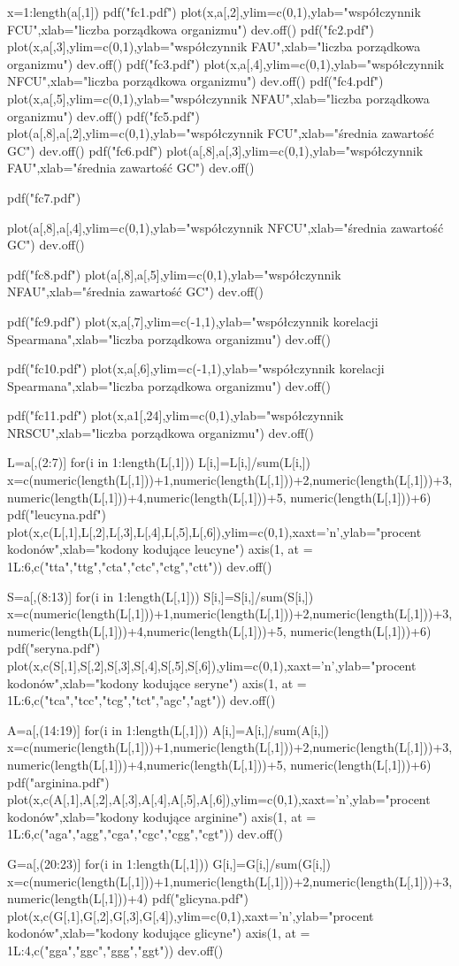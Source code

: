 x=1:length(a[,1])
pdf("fc1.pdf")
plot(x,a[,2],ylim=c(0,1),ylab="współczynnik FCU",xlab="liczba porządkowa organizmu")
dev.off() 
pdf("fc2.pdf")
plot(x,a[,3],ylim=c(0,1),ylab="współczynnik FAU",xlab="liczba porządkowa organizmu")
dev.off()
pdf("fc3.pdf")
plot(x,a[,4],ylim=c(0,1),ylab="współczynnik NFCU",xlab="liczba porządkowa organizmu")
 dev.off() 
 pdf("fc4.pdf")
 plot(x,a[,5],ylim=c(0,1),ylab="współczynnik NFAU",xlab="liczba porządkowa organizmu")
 dev.off() 
 pdf("fc5.pdf")
 plot(a[,8],a[,2],ylim=c(0,1),ylab="współczynnik FCU",xlab="średnia zawartość GC")
 dev.off()
 pdf("fc6.pdf")
 plot(a[,8],a[,3],ylim=c(0,1),ylab="współczynnik FAU",xlab="średnia zawartość GC")
 dev.off()
 
 pdf("fc7.pdf")

 plot(a[,8],a[,4],ylim=c(0,1),ylab="współczynnik NFCU",xlab="średnia zawartość GC")
 dev.off()

 pdf("fc8.pdf")
 plot(a[,8],a[,5],ylim=c(0,1),ylab="współczynnik NFAU",xlab="średnia zawartość GC")
 dev.off()
 
pdf("fc9.pdf")
plot(x,a[,7],ylim=c(-1,1),ylab="współczynnik korelacji Spearmana",xlab="liczba porządkowa organizmu")
 dev.off()

 pdf("fc10.pdf")
 plot(x,a[,6],ylim=c(-1,1),ylab="współczynnik korelacji Spearmana",xlab="liczba porządkowa organizmu")
 dev.off()

  
pdf("fc11.pdf")
plot(x,a1[,24],ylim=c(0,1),ylab="współczynnik NRSCU",xlab="liczba porządkowa organizmu")
 dev.off()

 L=a[,(2:7)]
 for(i in 1:length(L[,1]))
 {
 L[i,]=L[i,]/sum(L[i,])
 }
 x=c(numeric(length(L[,1]))+1,numeric(length(L[,1]))+2,numeric(length(L[,1]))+3,numeric(length(L[,1]))+4,numeric(length(L[,1]))+5,
 numeric(length(L[,1]))+6)
pdf("leucyna.pdf")
plot(x,c(L[,1],L[,2],L[,3],L[,4],L[,5],L[,6]),ylim=c(0,1),xaxt='n',ylab="procent kodonów",xlab="kodony kodujące leucyne")
axis(1, at = 1L:6,c("tta","ttg","cta","ctc","ctg","ctt"))
 dev.off()
 
  S=a[,(8:13)]
 for(i in 1:length(L[,1]))
 {
 S[i,]=S[i,]/sum(S[i,])
 }
 x=c(numeric(length(L[,1]))+1,numeric(length(L[,1]))+2,numeric(length(L[,1]))+3,numeric(length(L[,1]))+4,numeric(length(L[,1]))+5,
 numeric(length(L[,1]))+6)
pdf("seryna.pdf")
plot(x,c(S[,1],S[,2],S[,3],S[,4],S[,5],S[,6]),ylim=c(0,1),xaxt='n',ylab="procent kodonów",xlab="kodony kodujące seryne")
axis(1, at = 1L:6,c("tca","tcc","tcg","tct","agc","agt"))
 dev.off()
 
 
   A=a[,(14:19)]
 for(i in 1:length(L[,1]))
 {
 A[i,]=A[i,]/sum(A[i,])
 }
 x=c(numeric(length(L[,1]))+1,numeric(length(L[,1]))+2,numeric(length(L[,1]))+3,numeric(length(L[,1]))+4,numeric(length(L[,1]))+5,
 numeric(length(L[,1]))+6)
pdf("arginina.pdf")
plot(x,c(A[,1],A[,2],A[,3],A[,4],A[,5],A[,6]),ylim=c(0,1),xaxt='n',ylab="procent kodonów",xlab="kodony kodujące arginine")
axis(1, at = 1L:6,c("aga","agg","cga","cgc","cgg","cgt"))
 dev.off()
 
 
    G=a[,(20:23)]
 for(i in 1:length(L[,1]))
 {
 G[i,]=G[i,]/sum(G[i,])
 }
 x=c(numeric(length(L[,1]))+1,numeric(length(L[,1]))+2,numeric(length(L[,1]))+3,numeric(length(L[,1]))+4)
pdf("glicyna.pdf")
plot(x,c(G[,1],G[,2],G[,3],G[,4]),ylim=c(0,1),xaxt='n',ylab="procent kodonów",xlab="kodony kodujące glicyne")
axis(1, at = 1L:4,c("gga","ggc","ggg","ggt"))
 dev.off()
